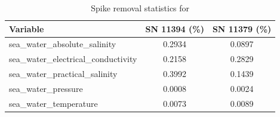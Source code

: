 \begin{table}[h]
\centering
\caption{Spike removal statistics for \projectname{} \casenumber{}}
\label{tab:spike_stats}
\begin{tabular}{|l|c|c|}
\hline
Variable & SN 11394 (\%) & SN 11379 (\%) \\
\hline
sea\_water\_absolute\_salinity & 0.2934 & 0.0897 \\
sea\_water\_electrical\_conductivity & 0.2158 & 0.2829 \\
sea\_water\_practical\_salinity & 0.3992 & 0.1439 \\
sea\_water\_pressure & 0.0008 & 0.0024 \\
sea\_water\_temperature & 0.0073 & 0.0089 \\
\hline
\end{tabular}
\end{table}
